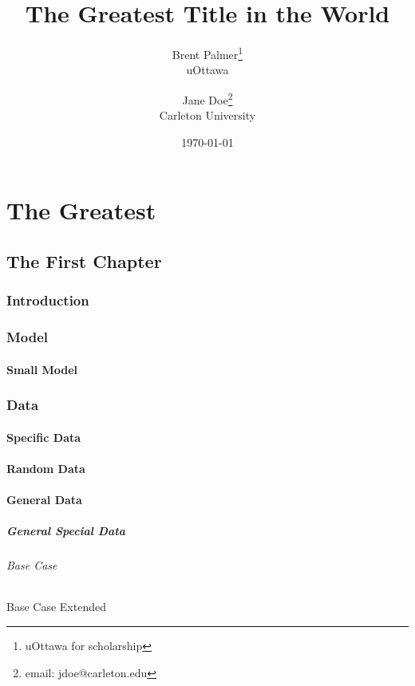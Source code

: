 \documentclass[12pt]{book}
\title{The Greatest Title in the World}
\author{Brent Palmer\thanks{uOttawa for scholarship}\\uOttawa \and Jane Doe\thanks{email: jdoe@carleton.edu}\\Carleton University}
\date{\today}
\begin{document}
\maketitle

\tableofcontents

\iffalse
\begin{abstract}
	\lipsum[7]
\end{abstract}

\textbf{keywords}: \emph{latex, editor, lecture}
\fi

\part{The Greatest}

\chapter{The First Chapter}

\section*{Introduction}

\lipsum[2]

\section{Model}

\lipsum[3]

\subsection{Small Model}

\lipsum[12]

\section{Data}

\lipsum[4]

\subsection{Specific Data}

\lipsum[5]

\subsection{Random Data}

\lipsum[7]

\subsection{General Data}

\lipsum[6]

\subsubsection{General Special Data}

\lipsum[8]

\paragraph{Base Case}

\lipsum[9]

\subparagraph{Base Case Extended}

\lipsum[10]
\end{document}
